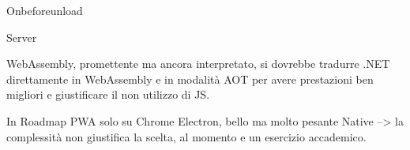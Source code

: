 Onbeforeunload

Server 

WebAssembly, promettente ma ancora interpretato, si dovrebbe tradurre .NET direttamente in WebAssembly e in modalità AOT per avere prestazioni ben migliori e giustificare il non utilizzo di JS.

In Roadmap
PWA solo su Chrome
Electron, bello ma molto pesante
Native --> la complessità non giustifica la scelta, al momento e un esercizio accademico.
